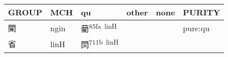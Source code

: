 \documentclass[14pt,a4paper]{scrartcl}
\begin{document}
\begin{longtable}[c]{@{}llllll@{}}
\toprule
\begin{minipage}[b]{0.14\columnwidth}\raggedright\strut
GROUP
\strut\end{minipage} &
\begin{minipage}[b]{0.14\columnwidth}\raggedright\strut
MCH
\strut\end{minipage} &
\begin{minipage}[b]{0.14\columnwidth}\raggedright\strut
qu
\strut\end{minipage} &
\begin{minipage}[b]{0.14\columnwidth}\raggedright\strut
other
\strut\end{minipage} &
\begin{minipage}[b]{0.14\columnwidth}\raggedright\strut
none
\strut\end{minipage} &
\begin{minipage}[b]{0.14\columnwidth}\raggedright\strut
PURITY
\strut\end{minipage}\tabularnewline
\midrule
\endhead
\begin{minipage}[t]{0.14\columnwidth}\raggedright\strut
閵
\strut\end{minipage} &
\begin{minipage}[t]{0.14\columnwidth}\raggedright\strut
ngin
\strut\end{minipage} &
\begin{minipage}[t]{0.14\columnwidth}\raggedright\strut
藺\textsuperscript{85fa~linH}
\strut\end{minipage} &
\begin{minipage}[t]{0.14\columnwidth}\raggedright\strut
\strut\end{minipage} &
\begin{minipage}[t]{0.14\columnwidth}\raggedright\strut
\strut\end{minipage} &
\begin{minipage}[t]{0.14\columnwidth}\raggedright\strut
pure:qu
\strut\end{minipage}\tabularnewline
\begin{minipage}[t]{0.14\columnwidth}\raggedright\strut
省
\strut\end{minipage} &
\begin{minipage}[t]{0.14\columnwidth}\raggedright\strut
linH
\strut\end{minipage} &
\begin{minipage}[t]{0.14\columnwidth}\raggedright\strut
焛\textsuperscript{711b~linH}
\strut\end{minipage} &

\end{longtable}
\end{document}
